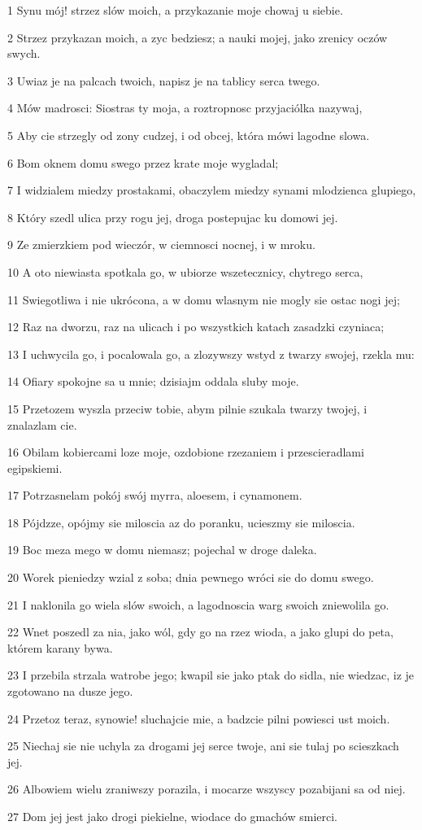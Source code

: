 \par 1 Synu mój! strzez slów moich, a przykazanie moje chowaj u siebie.
\par 2 Strzez przykazan moich, a zyc bedziesz; a nauki mojej, jako zrenicy oczów swych.
\par 3 Uwiaz je na palcach twoich, napisz je na tablicy serca twego.
\par 4 Mów madrosci: Siostras ty moja, a roztropnosc przyjaciólka nazywaj,
\par 5 Aby cie strzegly od zony cudzej, i od obcej, która mówi lagodne slowa.
\par 6 Bom oknem domu swego przez krate moje wygladal;
\par 7 I widzialem miedzy prostakami, obaczylem miedzy synami mlodzienca glupiego,
\par 8 Który szedl ulica przy rogu jej, droga postepujac ku domowi jej.
\par 9 Ze zmierzkiem pod wieczór, w ciemnosci nocnej, i w mroku.
\par 10 A oto niewiasta spotkala go, w ubiorze wszetecznicy, chytrego serca,
\par 11 Swiegotliwa i nie ukrócona, a w domu wlasnym nie mogly sie ostac nogi jej;
\par 12 Raz na dworzu, raz na ulicach i po wszystkich katach zasadzki czyniaca;
\par 13 I uchwycila go, i pocalowala go, a zlozywszy wstyd z twarzy swojej, rzekla mu:
\par 14 Ofiary spokojne sa u mnie; dzisiajm oddala sluby moje.
\par 15 Przetozem wyszla przeciw tobie, abym pilnie szukala twarzy twojej, i znalazlam cie.
\par 16 Obilam kobiercami loze moje, ozdobione rzezaniem i przescieradlami egipskiemi.
\par 17 Potrzasnelam pokój swój myrra, aloesem, i cynamonem.
\par 18 Pójdzze, opójmy sie miloscia az do poranku, ucieszmy sie miloscia.
\par 19 Boc meza mego w domu niemasz; pojechal w droge daleka.
\par 20 Worek pieniedzy wzial z soba; dnia pewnego wróci sie do domu swego.
\par 21 I naklonila go wiela slów swoich, a lagodnoscia warg swoich zniewolila go.
\par 22 Wnet poszedl za nia, jako wól, gdy go na rzez wioda, a jako glupi do peta, którem karany bywa.
\par 23 I przebila strzala watrobe jego; kwapil sie jako ptak do sidla, nie wiedzac, iz je zgotowano na dusze jego.
\par 24 Przetoz teraz, synowie! sluchajcie mie, a badzcie pilni powiesci ust moich.
\par 25 Niechaj sie nie uchyla za drogami jej serce twoje, ani sie tulaj po scieszkach jej.
\par 26 Albowiem wielu zraniwszy porazila, i mocarze wszyscy pozabijani sa od niej.
\par 27 Dom jej jest jako drogi piekielne, wiodace do gmachów smierci.


